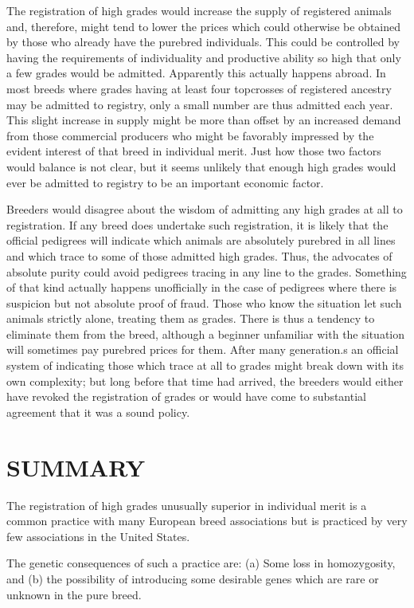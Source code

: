 The registration of high grades would increase the supply of registered
animals and, therefore, might tend to lower the prices which
could otherwise be obtained by those who already have the purebred
individuals. This could be controlled by having the requirements of
individuality and productive ability so high that only a few grades
would be admitted. Apparently this actually happens abroad. In most
breeds where grades having at least four topcrosses of registered ancestry
may be admitted to registry, only a small number are thus admitted
each year. This slight increase in supply might be more than offset by an
increased demand from those commercial producers who might be
favorably impressed by the evident interest of that breed in individual
merit. Just how those two factors would balance is not clear, but it
seems unlikely that enough high grades would ever be admitted to registry
to be an important economic factor.

Breeders would disagree about the wisdom of admitting any high
grades at all to registration. If any breed does undertake such registration,
it is likely that the official pedigrees will indicate which animals
are absolutely purebred in all lines and which trace to some of those
admitted high grades. Thus, the advocates of absolute purity could
avoid pedigrees tracing in any line to the grades. Something of that kind
actually happens unofficially in the case of pedigrees where there is suspicion
but not absolute proof of fraud. Those who know the situation
let such animals strictly alone, treating them as grades. There is thus a
tendency to eliminate them from the breed, although a beginner unfamiliar
with the situation will sometimes pay purebred prices for them.
After many generation.s an official system of indicating those which
trace at all to grades might break down with its own complexity; but
long before that time had arrived, the breeders would either have
revoked the registration of grades or would have come to substantial
agreement that it was a sound policy.

\section*{SUMMARY}

The registration of high grades unusually superior in individual
merit is a common practice with many European breed associations but
is practiced by very few associations in the United States.

The genetic consequences of such a practice are: (a) Some loss in
homozygosity, and (b) the possibility of introducing some desirable
genes which are rare or unknown in the pure breed.

